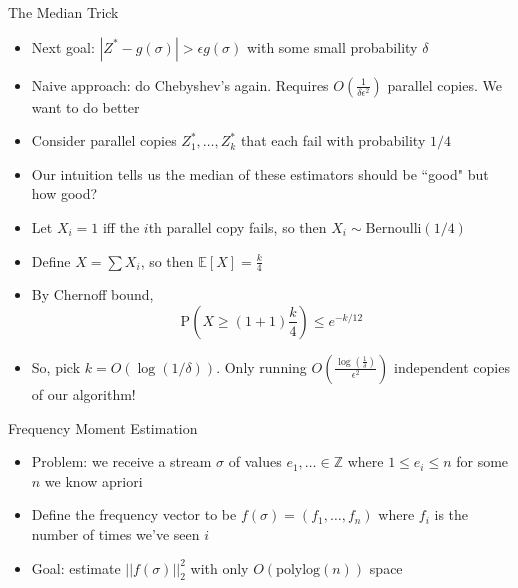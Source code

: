 \begin{frame}{The Median Trick}
\protect\hypertarget{the-median-trick}{}
\begin{itemize}
\tightlist
\item
  Next goal: \(|Z^* - g(\sigma)| > \epsilon g(\sigma)\) with some small
  probability \(\delta\)
\item
  Naive approach: do Chebyshev's again. Requires
  \(O\left(\frac{1}{\delta \epsilon^2} \right)\) parallel copies. We
  want to do better
\item
  Consider parallel copies \(Z^*_1, \dots, Z^*_k\) that each fail with
  probability \(1/4\)
\item
  Our intuition tells us the median of these estimators should be
  ``good" but how good?
\item
  Let \(X_i = 1\) iff the \(i\)th parallel copy fails, so then
  \(X_i \sim \text{Bernoulli}(1/4)\)
\item
  Define \(X = \sum X_i\), so then \(\mathbb{E}[X] = \frac{k}{4}\)
\item
  By Chernoff bound,
  \[\text{P}\left(X \geq (1+1)\frac{k}{4}\right) \leq e^{-k/12}\]
\item
  So, pick \(k = O(\log(1/\delta))\). Only running
  \(O\left(\frac{\log\left(\frac{1}{\delta}\right)}{\epsilon^2}\right)\)
  independent copies of our algorithm!
\end{itemize}
\end{frame}

\begin{frame}{Frequency Moment Estimation}
\protect\hypertarget{frequency-moment-estimation}{}
\begin{itemize}
\tightlist
\item
  Problem: we receive a stream \(\sigma\) of values
  \(e_1,\dots \in \mathbb{Z}\) where \(1 \leq e_i \leq n\) for some
  \(n\) we know apriori
\item
  Define the frequency vector to be \(f(\sigma) = (f_1,\dots,f_n)\)
  where \(f_i\) is the number of times we've seen \(i\)
\item
  Goal: estimate \(||f(\sigma)||_2^2\) with only
  \(O(\text{polylog}(n))\) space
\end{itemize}
\end{frame}

